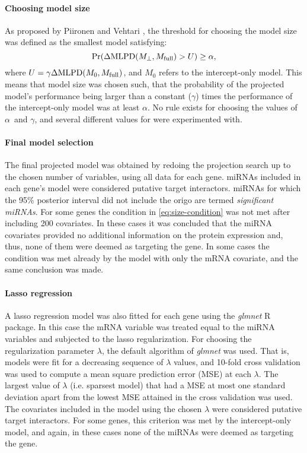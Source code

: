 \paragraph{Choosing model size}
As proposed by Piironen and Vehtari \citep{Piironen2016},
the threshold for choosing the model size was defined as the smallest
model satisfying:
\begin{equation}
	\label{eq:size-condition}
	\textup{Pr}(\Delta \textup{MLPD}(M_\perp,M_{\textup{full}}) > U) \geq \alpha,
\end{equation}
where $U = \gamma \Delta \textup{MLPD}(M_0,M_{\textup{full}})$, and
$M_0$ refers to the intercept-only model. This means that model
size was chosen such, that the probability of the projected model's
performance being larger than a constant ($\gamma$) times
the performance of the intercept-only model was at least $\alpha$.
No rule exists for choosing the values of $\alpha$ and $\gamma$, and
several different values for were experimented with.

\paragraph{Final model selection}
The final projected model was obtained by redoing the projection search up to
the chosen number of variables, using all data for each gene. miRNAs included
in each gene's model were considered putative target interactors. miRNAs for
which the 95\% posterior interval did not include the origo are termed
\emph{significant miRNAs}. For some genes the condition in \eqref{eq:size-condition} was not
met after including 200 covariates. In these cases it was concluded that the
miRNA covariates provided no additional information on the protein expression
and, thus, none of them were deemed as targeting the gene. In some cases the
condition was met already by the model with only the mRNA covariate, and the
same conclusion was made.

\paragraph{Lasso regression}
A lasso regression model was also fitted for each gene using the
\emph{glmnet} R package. In this case the mRNA variable was treated equal
to the miRNA variables and subjected to the lasso regularization. For choosing
the regularization parameter $\lambda$, the default algorithm of \emph{glmnet}
was used. That is, models were fit for a decreasing sequence of $\lambda$
values, and 10-fold cross validation was used to compute a mean square
prediction error (MSE) at each $\lambda$. The largest value of $\lambda$ (i.e.
sparsest model) that had a MSE at most one standard deviation apart from the
lowest MSE attained in the cross validation was used. The covariates included
in the model using the chosen $\lambda$ were considered putative target
interactors. For some genes, this criterion was met by the intercept-only
model, and again, in these cases none of the miRNAs were deemed as targeting
the gene.



